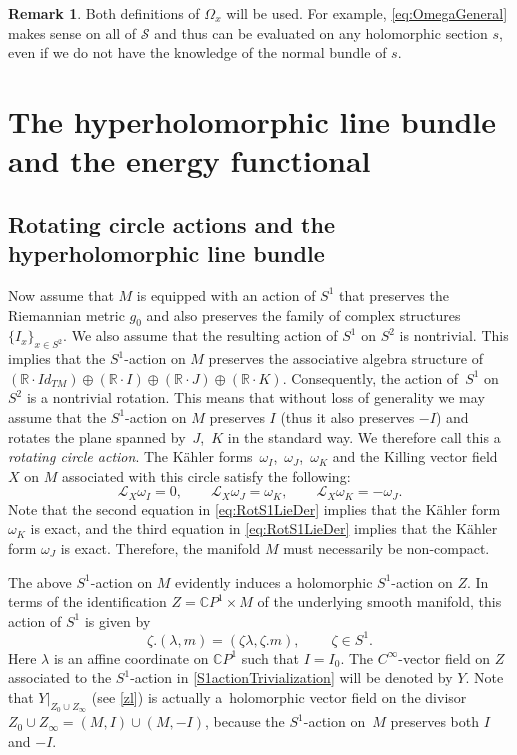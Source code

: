 \documentclass[pdftex]{sigma}
\numberwithin{equation}{section}
\theoremstyle{definition}
\newtheorem{Remark}[Theorem]{Remark}
\newcommand\C{{\mathbb C}}
\begin{document}
\begin{Remark}
Both definitions of $\Omega_x$ will be used. For example, \eqref{eq:OmegaGeneral} makes sense on all of $\mathcal S$ and thus
can be evaluated on any holomorphic section $s$, even if we do not have the knowledge of the normal bundle of $s$.
\end{Remark}

\section{The hyperholomorphic line bundle and the energy functional}
\label{sectionhyperholo}
\subsection{Rotating circle actions and the hyperholomorphic line bundle}\label{ss:rotating}

Now assume that $M$ is equipped with an action of $S^1$ that preserves the Riemannian metric $g_0$ and also preserves
the family of complex structures $\{I_x\}_{x\in S^2}$. We also assume that the resulting action of $S^1$
on $S^2$ is nontrivial. This implies that the $S^1$-action on $M$ preserves the associative algebra structure of
$({\mathbb R}\cdot {Id}_{TM})\oplus ({\mathbb R}\cdot I) \oplus ({\mathbb R}\cdot J)\oplus ({\mathbb R}\cdot K)$.
Consequently, the action of~$S^1$ on~$S^2$ is a nontrivial rotation.
This means that without loss of generality we may
assume that the $S^1$-action on $M$ preserves $I$ (thus it also preserves $-I$) and rotates the plane spanned by~$J$,~$K$ in the standard way. We therefore call this a \emph{rotating circle action}. The K\"ahler forms~$\omega_I$,~$\omega_J$,~$\omega_K$ and the Killing vector field $X$ on $M$ associated with this circle
satisfy the following:
\begin{equation}\label{eq:RotS1LieDer}
\mathcal L_X\omega_I = 0, \qquad \mathcal L_X\omega_J = \omega_K, \qquad \mathcal L_X\omega_K = -\omega_J.
\end{equation}
Note that the second equation in \eqref{eq:RotS1LieDer} implies that the K\"ahler form $\omega_K$ is exact,
and the third equation in \eqref{eq:RotS1LieDer} implies that the K\"ahler form $\omega_J$ is exact.
Therefore, the manifold $M$ must necessarily be non-compact.

The above $S^1$-action on $M$ evidently induces a holomorphic $S^1$-action on $Z$.
In terms of the identification $Z = \C P^1 \times M$ of the underlying smooth manifold, this
action of $S^1$ is given by
\begin{equation}\label{S1actionTrivialization}
\zeta.(\lambda, m) = (\zeta\lambda, \zeta.m), \qquad \ \zeta \in S^1 .
\end{equation}
Here $\lambda$ is an affine coordinate on $\C P^1$ such that $I = I_0$. The $C^\infty$-vector field
on $Z$ associated to the $S^1$-action in \eqref{S1actionTrivialization} will be denoted by $Y$. Note that
$Y\vert_{Z_0\cup Z_\infty}$ (see \eqref{zl}) is actually a~holomorphic vector field on the divisor
$Z_0 \cup Z_\infty = (M, I)\cup (M, -I)$,
because the $S^1$-action on~$M$ preserves both $I$ and $-I$.
\end{document}
